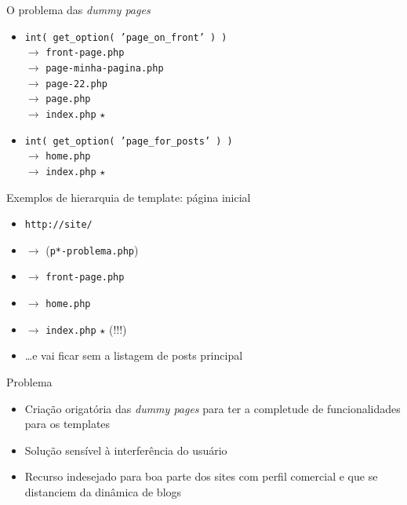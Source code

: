 \documentclass{beamer}
\begin{document}
\begin{frame}{O problema das \emph{dummy pages}}
\begin{itemize}
  \pause \item \texttt{int( get\_option( 'page\_on\_front' ) )} \\
    \pause $\rightarrow$ \texttt{front-page.php} \\
    \pause $\rightarrow$ \texttt{page-minha-pagina.php} \\
    \pause $\rightarrow$ \texttt{page-22.php} \\
    \pause $\rightarrow$ \texttt{page.php} \\
    \pause $\rightarrow$ \texttt{index.php} $\star$
  \pause \item \texttt{int( get\_option( 'page\_for\_posts' ) )} \\
    \pause $\rightarrow$ \texttt{home.php} \\
    \pause $\rightarrow$ \texttt{index.php} $\star$
\end{itemize}
\end{frame}

\begin{frame}{Exemplos de hierarquia de template: página inicial}
\begin{itemize}
  \pause \item \texttt{http://site/}
  \pause \item $\rightarrow$ (\texttt{p*-problema.php})
  \pause \item $\rightarrow$ \texttt{front-page.php}
  \pause \item $\rightarrow$ \texttt{home.php}
  \pause \item $\rightarrow$ \texttt{index.php} $\star$ (!!!)
  \pause \item \ldots e vai ficar sem a listagem de posts principal
\end{itemize}
\end{frame}

\begin{frame}{Problema}
\begin{itemize}
  \pause \item Criação origatória das \emph{dummy pages} para ter a completude
    de funcionalidades para os templates
  \pause \item Solução sensível à interferência do usuário
  \pause \item Recurso indesejado para boa parte dos sites com perfil comercial
    e que se distanciem da dinâmica de blogs
\end{itemize}
\end{frame}
\end{document}
